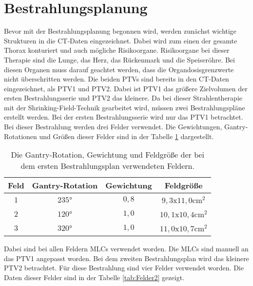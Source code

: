 \section{Bestrahlungsplanung}
\label{sec:Durchführung}

Bevor mit der Bestrahlungsplanung begonnen wird, werden zunächst wichtige Strukturen in die
CT-Daten eingezeichnet. Dabei wird zum einen der gesamte Thorax konturiert und auch mögliche
Risikoorgane. Risikoorgane bei dieser Therapie sind die Lunge, das Herz, das Rückenmark und die
Speiseröhre. Bei diesen Organen muss darauf geachtet werden, dass die Organdosisgrenzwerte nicht
überschritten werden. Die beiden PTVs sind bereits in den CT-Daten eingezeichnet, als PTV1 und PTV2.
Dabei ist PTV1 das größere Zielvolumen der ersten Bestrahlungsserie und PTV2 das kleinere.
Da bei dieser Strahlentherapie mit der Shrinking-Field-Technik gearbeitet wird, müssen
zwei Bestrahlungspläne erstellt werden.
Bei der ersten Bestrahlungsserie wird nur das PTV1 betrachtet. Bei dieser Bestrahlung werden
drei Felder verwendet. Die Gewichtungen, Gantry-Rotationen und Größen dieser Felder sind in der
Tabelle \ref{tab:Felder1} dargestellt.

\begin{table}
  \centering
  \caption{Die Gantry-Rotation, Gewichtung und Feldgröße der bei dem ersten Bestrahlungsplan verwendeten Feldern.}
  \label{tab:Felder1}
  \begin{tabular}{c c c c}
    \toprule
    Feld & Gantry-Rotation & Gewichtung & Feldgröße\\
    \midrule
    $1$ & $235°$ & $0,8$ & $9,3$x$11,0 \si{\centi\meter\squared}$ \\
    $2$ & $120°$ & $1,0$ & $10,1$x$10,4 \si{\centi\meter\squared}$ \\
    $3$ & $320°$ & $1,0$ & $11,0$x$10,7 \si{\centi\meter\squared}$ \\
    \bottomrule
  \end{tabular}
\end{table}

Dabei sind bei allen Feldern MLCs verwendet worden. Die MLCs sind manuell an das PTV1 angepasst worden.
Bei dem zweiten Bestrahlungsplan wird das kleinere PTV2 betrachtet. Für diese Bestrahlung sind vier Felder
verwendet worden. Die Daten dieser Felder sind in der Tabelle \ref{tab:Felder2} gezeigt.

